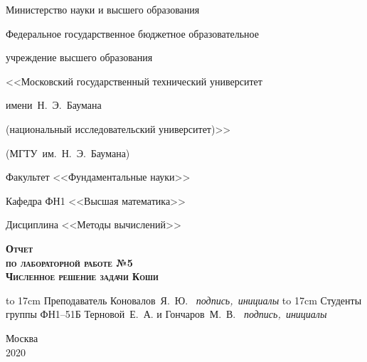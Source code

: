 \documentclass[a4paper,12pt]{extarticle}
\begin{document}
    \begin{titlepage}

        \begin{center}
            \centerline{\Large\rm Министерство науки и высшего образования}
            \centerline{\Large\rm Федеральное государственное бюджетное образовательное}
            \centerline{\Large\rm учреждение высшего образования}
            \centerline{\Large\rm <<Московский государственный технический университет}
            \centerline{\Large\rm имени~Н.~Э.~Баумана}
            \centerline{\Large\rm (национальный исследовательский университет)>>}
            \centerline{\Large\rm (МГТУ~им.~Н.~Э.~Баумана)}
            \hrulefill
        \end{center}

        \begin{figure}[h!]
            \centering
        \end{figure}

        \begin{center}
            \centerline{\Large\rm Факультет <<Фундаментальные науки>>}
            \centerline{\Large\rm Кафедра ФН1 <<Высшая математика>>}
            \centerline{\Large\rm Дисциплина <<Методы вычислений>>}
        \end{center}

        \begin{center}
            \textsc{\textbf{\Huge Отчет}}\\
            \textsc{\textbf{\large по лабораторной работе №5}}\\
            \textsc{\textbf{\large Численное решение задачи Коши}}\\
        \end{center}

        \vspace{3em}

        {
        \large
        \hbox to 17cm {Преподаватель \hspace{45pt} \hrulefill \hspace{60pt} Коновалов~Я.~Ю.}
        \vspace{-7pt}
        \hbox{{\small\it \hspace{178pt} подпись, инициалы}}
        \hbox{}
        \hbox to 17cm {Студенты группы ФН1--51Б \hrulefill \hspace{1pt} Терновой~Е.~А. и Гончаров~М.~В.}
        \vspace{-7pt}
        \hbox{{\small\it \hspace{178pt} подпись, инициалы}}
        }


        \vspace{\fill}

        \begin{center}
            \large	Москва \\2020
        \end{center}

    \end{titlepage}
\end{document}
